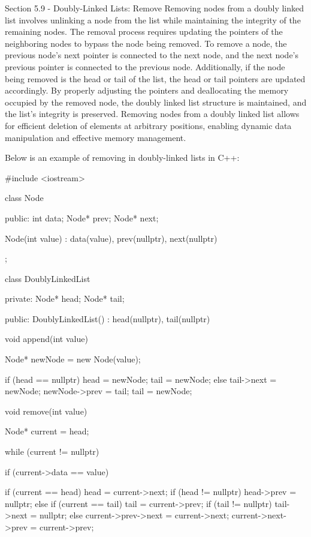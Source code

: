 \begin{notes}{Section 5.9 - Doubly-Linked Lists: Remove}
    Removing nodes from a doubly linked list involves unlinking a node from the list while maintaining the integrity of the remaining nodes. The removal process requires updating the pointers of the neighboring nodes to bypass the node being removed. To remove a node, the previous node's next pointer is connected to the next node, 
    and the next node's previous pointer is connected to the previous node. Additionally, if the node being removed is the head or tail of the list, the head or tail pointers are updated accordingly. By properly adjusting the pointers and deallocating the memory occupied by the removed node, the doubly linked list structure is 
    maintained, and the list's integrity is preserved. Removing nodes from a doubly linked list allows for efficient deletion of elements at arbitrary positions, enabling dynamic data manipulation and effective memory management.
    
    \begin{highlight}
        Below is an example of removing in doubly-linked lists in C++:
    
    \begin{code}[C++]
    #include <iostream>

    class Node {
    public:
        int data;
        Node* prev;
        Node* next;
    
        Node(int value) : data(value), prev(nullptr), next(nullptr) {}
    };
    
    class DoublyLinkedList {
    private:
        Node* head;
        Node* tail;
    
    public:
        DoublyLinkedList() : head(nullptr), tail(nullptr) {}
    
        void append(int value) {
            Node* newNode = new Node(value);
    
            if (head == nullptr) {
                head = newNode;
                tail = newNode;
            } else {
                tail->next = newNode;
                newNode->prev = tail;
                tail = newNode;
            }
        }
    
        void remove(int value) {
            Node* current = head;
    
            while (current != nullptr) {
                if (current->data == value) {
                    if (current == head) {
                        head = current->next;
                        if (head != nullptr) {
                            head->prev = nullptr;
                        }
                    } else if (current == tail) {
                        tail = current->prev;
                        if (tail != nullptr) {
                            tail->next = nullptr;
                        }
                    } else {
                        current->prev->next = current->next;
                        current->next->prev = current->prev;
                    }
    
}}}}
\end{code}
\end{highlight}
\end{notes}
